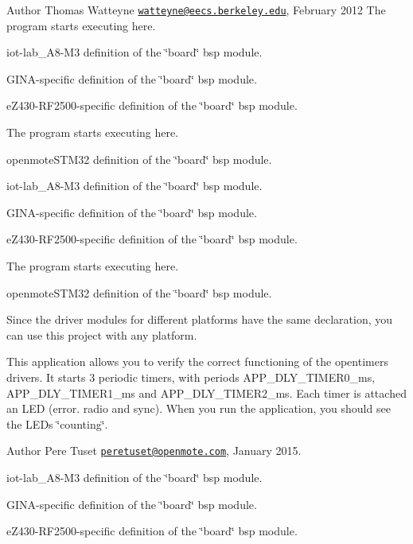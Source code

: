 \begin{DoxyAuthor}{Author}
Thomas Watteyne \href{mailto:watteyne@eecs.berkeley.edu}{\tt watteyne@eecs.\+berkeley.\+edu}, February 2012 The program starts executing here.
\end{DoxyAuthor}
iot-\/lab\+\_\+\+A8-\/\+M3 definition of the \char`\"{}board\char`\"{} bsp module.

G\+I\+N\+A-\/specific definition of the \char`\"{}board\char`\"{} bsp module.

e\+Z430-\/\+R\+F2500-\/specific definition of the \char`\"{}board\char`\"{} bsp module.

The program starts executing here.

openmote\+S\+T\+M32 definition of the \char`\"{}board\char`\"{} bsp module.

iot-\/lab\+\_\+\+A8-\/\+M3 definition of the \char`\"{}board\char`\"{} bsp module.

G\+I\+N\+A-\/specific definition of the \char`\"{}board\char`\"{} bsp module.

e\+Z430-\/\+R\+F2500-\/specific definition of the \char`\"{}board\char`\"{} bsp module.

The program starts executing here.

openmote\+S\+T\+M32 definition of the \char`\"{}board\char`\"{} bsp module.

Since the driver modules for different platforms have the same declaration, you can use this project with any platform.

This application allows you to verify the correct functioning of the opentimers drivers. It starts 3 periodic timers, with periods A\+P\+P\+\_\+\+D\+L\+Y\+\_\+\+T\+I\+M\+E\+R0\+\_\+ms, A\+P\+P\+\_\+\+D\+L\+Y\+\_\+\+T\+I\+M\+E\+R1\+\_\+ms and A\+P\+P\+\_\+\+D\+L\+Y\+\_\+\+T\+I\+M\+E\+R2\+\_\+ms. Each timer is attached an L\+ED (error. radio and sync). When you run the application, you should see the L\+E\+Ds \char`\"{}counting\char`\"{}.

\begin{DoxyAuthor}{Author}
Pere Tuset \href{mailto:peretuset@openmote.com}{\tt peretuset@openmote.\+com}, January 2015.
\end{DoxyAuthor}
iot-\/lab\+\_\+\+A8-\/\+M3 definition of the \char`\"{}board\char`\"{} bsp module.

G\+I\+N\+A-\/specific definition of the \char`\"{}board\char`\"{} bsp module.

e\+Z430-\/\+R\+F2500-\/specific definition of the \char`\"{}board\char`\"{} bsp module.

